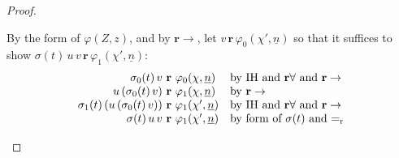 \documentclass[10pt,a4paper]{amsart}
\theoremstyle{plain}
\theoremstyle{definition}
\renewcommand{\phi}{\varphi}
\theoremstyle{plain}
\theoremstyle{definition} %
\newcommand{\numeral}[1]{\underline{#1}}
\newcommand{\reduction}{\mathrm{r}}
\newcommand{\converts}{=_{\reduction}}
\newcommand{\limp}{\to}
\newcommand{\realises}{\mathbf{r}}
\begin{document}
\begin{proof}
\begin{itemize}
        By the form of $\phi(Z,z)$, and by $\realises\limp$, let $v\, \realises\, \phi_0(\chi',\numeral n)$ so that it suffices to show $\sigma(t)\, u\, v\, \realises\, \phi_1(\chi', \numeral n)$:
        \[
        \begin{array}{r@{\ \realises\ }ll}
             \sigma_0(t)\, v & \phi_0 (\chi,\numeral n) & \text{by IH and $\realises\forall $ and $\realises\limp$} \\
             u\, (\sigma_0(t)\, v) & \phi_1(\chi,\numeral n) & \text{by $\realises\limp$} \\
             \sigma_1(t)\, (u\, (\sigma_0(t)\, v)) & \phi_1(\chi',\numeral n) & \text{by IH and $\realises\forall$ and $\realises\limp$} \\
             \sigma(t)\, u\, v & \phi_1(\chi',\numeral n) & \text{by form of $\sigma(t)$ and $\converts$}
        \end{array}
        \]
        

\end{itemize}
\end{proof}
\end{document}
